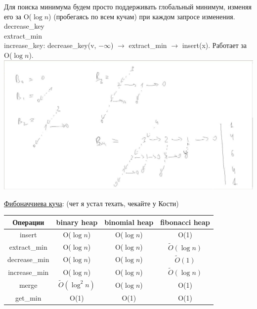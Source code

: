 \documentclass{article}
\newcommand{\tu}[1]{\underline{#1}}
\begin{document}
Для поиска минимума будем просто поддерживать глобальный минимум, изменяя его за O($\log n$) (пробегаясь по всем кучам) при каждом запросе изменения. \\

decrease\_key \\

extract\_min \\

increase\_key: decrease\_key(v, $-\infty$) $\to$ extract\_min $\to$ insert(x). Работает за O($\log n$). \\ 

\includegraphics[width=15cm]{../pictures/binominial_heap.png}

\tu{Фибоначчиева куча}: (чет я устал техать, чекайте у Кости)

\begin{center}
\begin{tabular}{|c|c|c|c|}
\hline
Операции        &   binary heap             & binomial heap & fibonacci heap        \\
\hline
insert          &   O($\log n$)             & O($\log n$)   & O(1)                  \\
extract\_min    &   O($\log n$)             & O($\log n$)   & $\tilde{O}(\log n)$   \\
decrease\_min   &   O($\log n$)             & O($\log n$)   & $\tilde{O}(1)$        \\
increase\_min   &   O($\log n$)             & O($\log n$)   & $\tilde{O}(\log n)$   \\
merge           &   $\tilde{O}(\log^2 n)$   & O($\log n$)   & O(1)                  \\
get\_min        &   O(1)                    & O(1)          & O(1)                  \\
\hline
\end{tabular}
\end{center}
\end{document}
